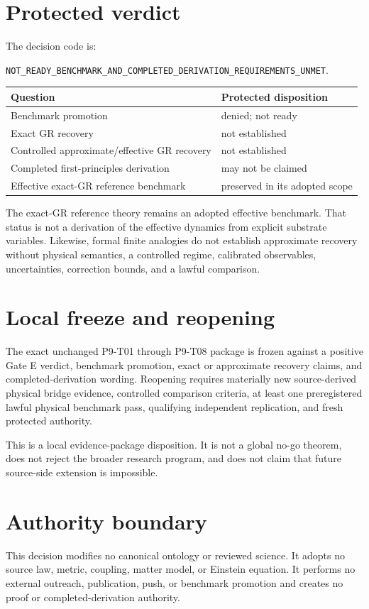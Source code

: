 \documentclass[11pt]{article}
\begin{document}
\section{Protected verdict}

The decision code is:

\begin{center}
\texttt{NOT\_READY\_BENCHMARK\_AND\_COMPLETED\_DERIVATION\_REQUIREMENTS\_UNMET}.
\end{center}

\begin{table}[h]
\centering
\begin{tabular}{ll}
\toprule
Question & Protected disposition \\
\midrule
Benchmark promotion & denied; not ready \\
Exact GR recovery & not established \\
Controlled approximate/effective GR recovery & not established \\
Completed first-principles derivation & may not be claimed \\
Effective exact-GR reference benchmark & preserved in its adopted scope \\
\bottomrule
\end{tabular}
\end{table}

The exact-GR reference theory remains an adopted effective benchmark.  That
status is not a derivation of the effective dynamics from explicit substrate
variables.  Likewise, formal finite analogies do not establish approximate
recovery without physical semantics, a controlled regime, calibrated
observables, uncertainties, correction bounds, and a lawful comparison.

\section{Local freeze and reopening}

The exact unchanged P9-T01 through P9-T08 package is frozen against a positive
Gate E verdict, benchmark promotion, exact or approximate recovery claims,
and completed-derivation wording.  Reopening requires materially new
source-derived physical bridge evidence, controlled comparison criteria, at
least one preregistered lawful physical benchmark pass, qualifying independent
replication, and fresh protected authority.

This is a local evidence-package disposition.  It is not a global no-go
theorem, does not reject the broader research program, and does not claim that
future source-side extension is impossible.

\section{Authority boundary}

This decision modifies no canonical ontology or reviewed science.  It adopts
no source law, metric, coupling, matter model, or Einstein equation.  It
performs no external outreach, publication, push, or benchmark promotion and
creates no proof or completed-derivation authority.
\end{document}
